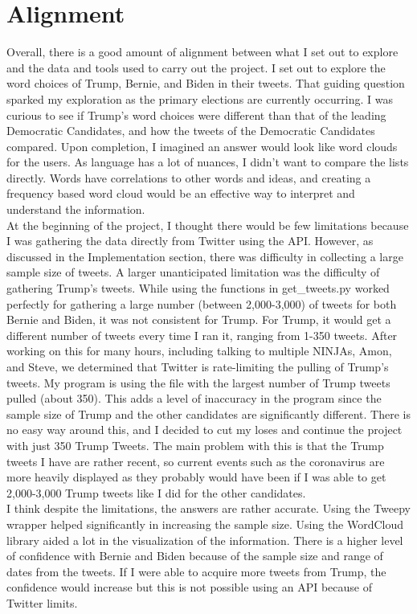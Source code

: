 \documentclass{article}
\begin{document}
\section{Alignment}
Overall, there is a good amount of alignment between what I set out to explore and the data and tools used to carry out the project. I set out to explore the word choices of Trump, Bernie, and Biden in their tweets. That guiding question sparked my exploration as the primary elections are currently occurring. I was curious to see if Trump's word choices were different than that of the leading Democratic Candidates, and how the tweets of the Democratic Candidates compared. Upon completion, I imagined an answer would look like word clouds for the users. As language has a lot of nuances, I didn't want to compare the lists directly. Words have correlations to other words and ideas, and creating a frequency based word cloud would be an effective way to interpret and understand the information. \\
\bigskip
At the beginning of the project, I thought there would be few limitations because I was gathering the data directly from Twitter using the API. However, as discussed in the Implementation section, there was difficulty in collecting a large sample size of tweets. A larger unanticipated limitation was the difficulty of gathering Trump's tweets. While using the functions in get\_tweets.py worked perfectly for gathering a large number (between 2,000-3,000) of tweets for both Bernie and Biden, it was not consistent for Trump. For Trump, it would get a different number of tweets every time I ran it, ranging from 1-350 tweets. After working on this for many hours, including talking to multiple NINJAs, Amon, and Steve, we determined that Twitter is rate-limiting the pulling of Trump's tweets. My program is using the file with the largest number of Trump tweets pulled (about 350). This adds a level of inaccuracy in the program since the sample size of Trump and the other candidates are significantly different. There is no easy way around this, and I decided to cut my loses and continue the project with just 350 Trump Tweets. The main problem with this is that the Trump tweets I have are rather recent, so current events such as the coronavirus are more heavily displayed as they probably would have been if I was able to get 2,000-3,000 Trump tweets like I did for the other candidates. \\
\bigskip
I think despite the limitations, the answers are rather accurate. Using the Tweepy wrapper helped significantly in increasing the sample size. Using the WordCloud library aided a lot in the visualization of the information. There is a higher level of confidence with Bernie and Biden because of the sample size and range of dates from the tweets. If I were able to acquire more tweets from Trump, the confidence would increase but this is not possible using an API because of Twitter limits. 
\end{document}
